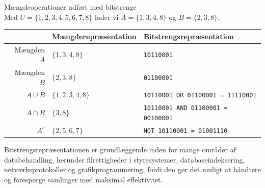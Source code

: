 \begin{example}Mængdeoperationer udført med bitstrenge\\
    Med $U = \{1, 2, 3, 4, 5, 6, 7, 8\}$ lader vi $A = \{1, 3, 4, 8\}$ og $B = \{2, 3, 8\}$.
    
    \begin{center}
    \renewcommand{\arraystretch}{1.4}
    \begin{tabular}{rll}
         & \textbf{Mængderepræsentation} & \textbf{Bitstrengsrepræsentation} \\
        \hline
        Mængden $A$ & $\{1, 3, 4, 8\}$ & \texttt{10110001} \\
        Mængden $B$ & $\{2, 3, 8\}$ & \texttt{01100001} \\
        \hline
        $A \cup B$ & $\{1, 2, 3, 4, 8\}$ & \texttt{10110001 OR 01100001 = 11110001} \\
        $A \cap B$ & $\{3, 8\}$ & \texttt{10110001 AND 01100001 = 00100001} \\
        $A^c$ & $\{2, 5, 6, 7\}$ & \texttt{NOT 10110001 = 01001110} \\
    \end{tabular}
    \end{center}
\end{example}

Bitstrengsrepræsentationen er grundlæggende inden for mange områder af databehandling, herunder filrettigheder i styresystemer, databaseindeksering, netværksprotokoller og grafikprogrammering, fordi den gør det muligt at håndtere og forespørge samlinger med maksimal effektivitet.
